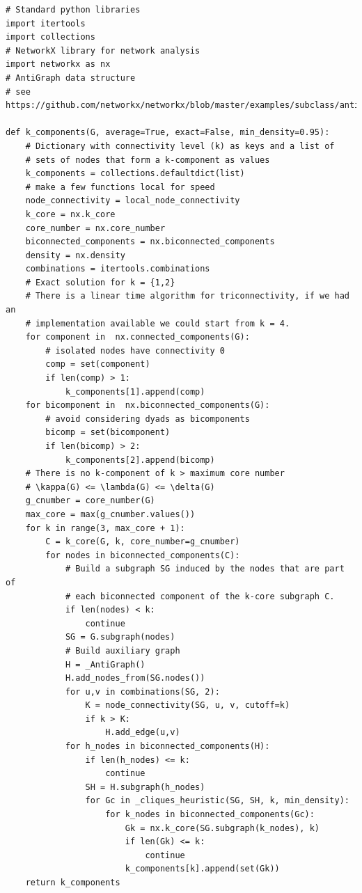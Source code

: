 \begin{scriptsize}
\begin{lstlisting}
# Standard python libraries
import itertools
import collections
# NetworkX library for network analysis
import networkx as nx
# AntiGraph data structure
# see https://github.com/networkx/networkx/blob/master/examples/subclass/antigraph.py

def k_components(G, average=True, exact=False, min_density=0.95):
    # Dictionary with connectivity level (k) as keys and a list of
    # sets of nodes that form a k-component as values
    k_components = collections.defaultdict(list)
    # make a few functions local for speed
    node_connectivity = local_node_connectivity
    k_core = nx.k_core
    core_number = nx.core_number
    biconnected_components = nx.biconnected_components
    density = nx.density
    combinations = itertools.combinations
    # Exact solution for k = {1,2}
    # There is a linear time algorithm for triconnectivity, if we had an
    # implementation available we could start from k = 4.
    for component in  nx.connected_components(G):
        # isolated nodes have connectivity 0
        comp = set(component)
        if len(comp) > 1:
            k_components[1].append(comp)
    for bicomponent in  nx.biconnected_components(G):
        # avoid considering dyads as bicomponents
        bicomp = set(bicomponent)
        if len(bicomp) > 2:
            k_components[2].append(bicomp)
    # There is no k-component of k > maximum core number
    # \kappa(G) <= \lambda(G) <= \delta(G)
    g_cnumber = core_number(G)
    max_core = max(g_cnumber.values())
    for k in range(3, max_core + 1):
        C = k_core(G, k, core_number=g_cnumber)
        for nodes in biconnected_components(C):
            # Build a subgraph SG induced by the nodes that are part of
            # each biconnected component of the k-core subgraph C.
            if len(nodes) < k:
                continue
            SG = G.subgraph(nodes)
            # Build auxiliary graph
            H = _AntiGraph()
            H.add_nodes_from(SG.nodes())
            for u,v in combinations(SG, 2):
                K = node_connectivity(SG, u, v, cutoff=k)
                if k > K:
                    H.add_edge(u,v)
            for h_nodes in biconnected_components(H):
                if len(h_nodes) <= k:
                    continue
                SH = H.subgraph(h_nodes)
                for Gc in _cliques_heuristic(SG, SH, k, min_density):
                    for k_nodes in biconnected_components(Gc):
                        Gk = nx.k_core(SG.subgraph(k_nodes), k)
                        if len(Gk) <= k:
                            continue
                        k_components[k].append(set(Gk))
    return k_components



\end{lstlisting}
\end{scriptsize}
